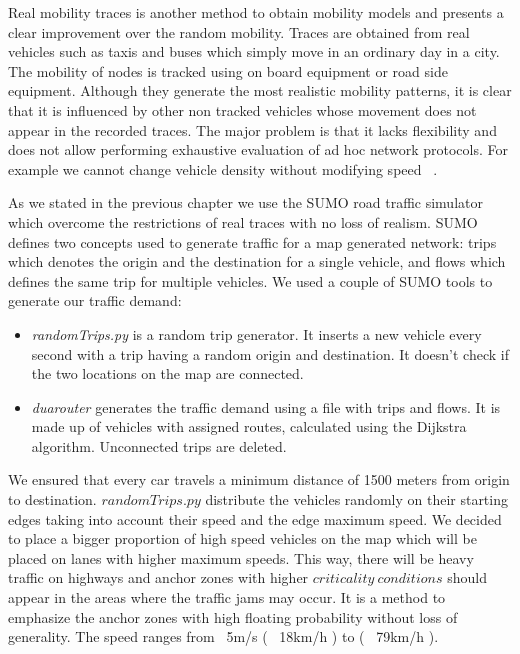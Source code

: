 Real mobility traces is another method to obtain mobility models and presents a
clear improvement over the random mobility. Traces are obtained from real
vehicles such as taxis and buses which simply move in an ordinary day in a city.
The mobility of nodes is tracked using on board equipment or road side
equipment. Although they generate the most realistic mobility patterns, it is
clear that it is influenced by other non tracked vehicles whose movement does
not appear in the recorded traces. The major problem is that it lacks
flexibility and does not allow performing exhaustive evaluation of ad hoc
network protocols. For example we cannot change vehicle density without
modifying speed ~\cite{baguena2013vacamobil}.

As we stated in the previous chapter we use the SUMO road traffic simulator
which overcome the restrictions of real traces with no loss of realism. SUMO
defines two concepts used to generate traffic for a map generated network: trips
which denotes the origin and the destination for a single vehicle, and flows
which defines the same trip for multiple vehicles. We used a couple of SUMO
tools to generate our traffic demand:

\begin{itemize}
  \item {\it randomTrips.py} is a random trip generator. It inserts a
  new vehicle every second with a trip having a random origin and destination.
  It doesn't check if the two locations on the map are connected.
  \item {\it duarouter} generates the traffic demand using a file with trips and
  flows. It is made up of vehicles with assigned routes, calculated using the
  Dijkstra algorithm. Unconnected trips are deleted.
\end{itemize}

We ensured that every car travels a minimum distance of 1500 meters from origin
to destination. $randomTrips.py$ distribute the vehicles randomly on their
starting edges taking into account their speed and the edge maximum speed. We
decided to place a bigger proportion of high speed vehicles on the map which
will be placed on lanes with higher maximum speeds. This way, there will
be heavy traffic on highways and anchor zones with higher $criticality\ 
conditions$ should appear in the areas where the traffic jams may occur. It is a
method to emphasize the anchor zones with high floating probability without loss of
generality. The speed ranges from ~5m/s ( ~18km/h ) to ( ~79km/h ).

